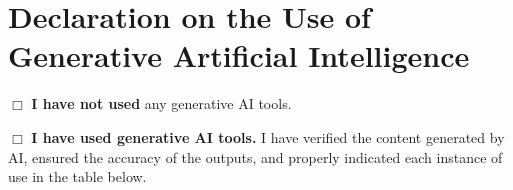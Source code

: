 \clearpage
\section{Declaration on the Use of Generative Artificial Intelligence}

\noindent $\Box$ \textbf{I have not used} any generative AI tools.

\noindent $\Box$ \textbf{I have used generative AI tools.} I have verified the content generated by AI, ensured the accuracy of the outputs, and properly indicated each instance of use in the table below.

